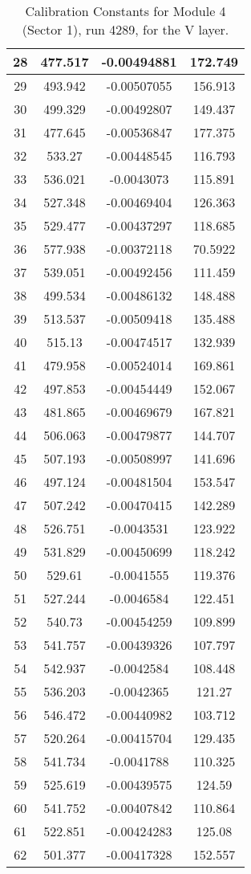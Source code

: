 \begin{table}[h]
{\begin{tabular}{|c|c|c|c|}
28	&	477.517	&	-0.00494881	&	172.749	\\	\hline
29	&	493.942	&	-0.00507055	&	156.913	\\	\hline
30	&	499.329	&	-0.00492807	&	149.437	\\	\hline
31	&	477.645	&	-0.00536847	&	177.375	\\	\hline
32	&	533.27	&	-0.00448545	&	116.793	\\	\hline
33	&	536.021	&	-0.0043073	&	115.891	\\	\hline
34	&	527.348	&	-0.00469404	&	126.363	\\	\hline
35	&	529.477	&	-0.00437297	&	118.685	\\	\hline
36	&	577.938	&	-0.00372118	&	70.5922	\\	\hline
37	&	539.051	&	-0.00492456	&	111.459	\\	\hline
38	&	499.534	&	-0.00486132	&	148.488	\\	\hline
39	&	513.537	&	-0.00509418	&	135.488	\\	\hline
40	&	515.13	&	-0.00474517	&	132.939	\\	\hline
41	&	479.958	&	-0.00524014	&	169.861	\\	\hline
42	&	497.853	&	-0.00454449	&	152.067	\\	\hline
43	&	481.865	&	-0.00469679	&	167.821	\\	\hline
44	&	506.063	&	-0.00479877	&	144.707	\\	\hline
45	&	507.193	&	-0.00508997	&	141.696	\\	\hline
46	&	497.124	&	-0.00481504	&	153.547	\\	\hline
47	&	507.242	&	-0.00470415	&	142.289	\\	\hline
48	&	526.751	&	-0.0043531	&	123.922	\\	\hline
49	&	531.829	&	-0.00450699	&	118.242	\\	\hline
50	&	529.61	&	-0.0041555	&	119.376	\\	\hline
51	&	527.244	&	-0.0046584	&	122.451	\\	\hline
52	&	540.73	&	-0.00454259	&	109.899	\\	\hline
53	&	541.757	&	-0.00439326	&	107.797	\\	\hline
54	&	542.937	&	-0.0042584	&	108.448	\\	\hline
55	&	536.203	&	-0.0042365	&	121.27	\\	\hline
56	&	546.472	&	-0.00440982	&	103.712	\\	\hline
57	&	520.264	&	-0.00415704	&	129.435	\\	\hline
58	&	541.734	&	-0.0041788	&	110.325	\\	\hline
59	&	525.619	&	-0.00439575	&	124.59	\\	\hline
60	&	541.752	&	-0.00407842	&	110.864	\\	\hline
61	&	522.851	&	-0.00424283	&	125.08	\\	\hline
62	&	501.377	&	-0.00417328	&	152.557	\\	\hline
            \end{tabular}
        }
        \caption{Calibration Constants for Module 4 (Sector 1), run 4289, for the V layer.}
\end{table}


